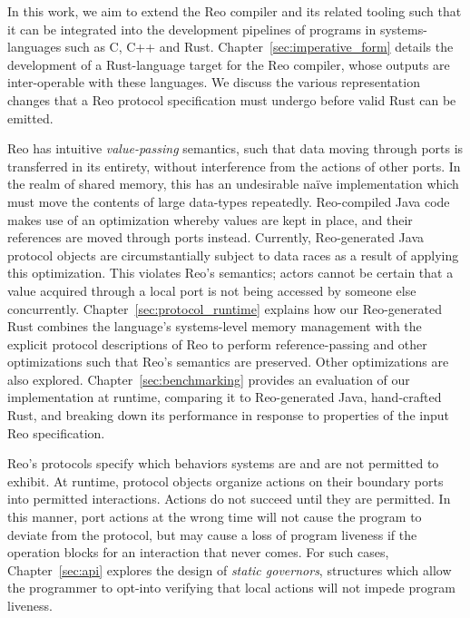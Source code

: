 In this work, we aim to extend the Reo compiler and its related tooling such that it can be integrated into the development pipelines of programs in systems-languages such as C, C++ and Rust. Chapter~\ref{sec:imperative_form} details the development of a Rust-language target for the Reo compiler, whose outputs are inter-operable with these languages. We discuss the various representation changes that a Reo protocol specification must undergo before valid Rust can be emitted.

Reo has intuitive \textit{value-passing} semantics, such that data moving through ports is transferred in its entirety, without interference from the actions of other ports. In the realm of shared memory, this has an undesirable na\"ive implementation which must move the contents of large data-types repeatedly. Reo-compiled Java code makes use of an optimization whereby values are kept in place, and their references are moved through ports instead. Currently, Reo-generated Java protocol objects are circumstantially subject to data races as a result of applying this optimization. This violates Reo's semantics; actors cannot be certain that a value acquired through a local port is not being accessed by someone else concurrently. Chapter~\ref{sec:protocol_runtime} explains how our Reo-generated Rust combines the language's systems-level memory management with the explicit protocol descriptions of Reo to perform reference-passing and other optimizations such that Reo's semantics are preserved. Other 
optimizations are also explored. Chapter~\ref{sec:benchmarking} provides an evaluation of our implementation at runtime, comparing it to Reo-generated Java, hand-crafted Rust, and breaking down its performance in response to properties of the input Reo specification.

Reo's protocols specify which behaviors systems are and are not permitted to exhibit. At runtime, protocol objects organize actions on their boundary ports into permitted interactions. Actions do not succeed until they are permitted. In this manner, port actions at the wrong time will not cause the program to deviate from the protocol, but may cause a loss of program liveness if the operation blocks for an interaction that never comes. For such cases, Chapter~\ref{sec:api} explores the design of \textit{static governors}, structures which allow the programmer to opt-into verifying that local actions will not impede program liveness.

